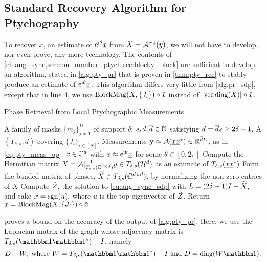 \subsection{Standard Recovery Algorithm for Ptychography}
\label{sec:pty_std_rec}
To recover $x$, an estimate of $\mathrm{e}^{\mathrm{i} \theta} \underline{x}$ from $X = \mathcal{A}^{-1}(y)$, we will not have to develop, nor even prove, any more technology.  The contents of \cref{ch:ang_sync,sec:con_number_ptych,sec:blocky_block} are sufficient to develop an algorithm, stated in \cref{alg:pty_pr} that is proven in \cref{thm:pty_rec} to stably produce an estimate of $\mathrm{e}^{\mathrm{i} \theta} \underline{x}$.  This algorithm differs very little from \cref{alg:pr_sdp}, except that in line 4, we use $\operatorname{BlockMag}(X, \{J_i\}) \circ \tilde{x}$ instead of $\lvert\operatorname{vec} \operatorname{diag}(X)\rvert \circ \tilde{x}$.

\begin{algorithm}
\renewcommand{\algorithmicrequire}{\textbf{Input:}}
\renewcommand{\algorithmicensure}{\textbf{Output:}}
\caption{Phase Retrieval from Local Ptychographic Measurements}
\label{alg:pty_pr}
\begin{algorithmic}[1]
    \REQUIRE A family of masks $\{m_j\}_{j = 1}^D$ of support $\delta$; $s, d, \overline{d} \in \mathbb{N}$ satisfying $d = \overline{d} s \ge 2 \delta - 1$.  A $(T_{\delta, s}, d)$-covering $\{J_i\}_{i \in [N]}$.  Measurements $\mathbf{y} \approx \mathcal{A}(\underline{x} \underline{x}^*) \in \mathbb{R}^{\overline{d} D}$, as in \eqref{eq:pty_meas_op}.
    \ENSURE $x \in \mathbb{C}^d$ with $x \approx \mathrm{e}^{\mathrm{i} \theta} \underline{x}$ for some $\theta \in [0, 2 \pi]$
    \STATE Compute the Hermitian matrix $X = \mathcal{A}|_{T_{\delta, s}(\mathbb{C}^{d \times d})}^{-1} y \in T_{\delta, s}(\mathcal{H}^d)$ as an estimate of $T_{\delta, s}(\underline{x} \underline{x}^*)$
    \STATE Form the banded matrix of phases, $\widetilde{X} \in T_{\delta, s}(\mathbb{C}^{d \times d})$, by normalizing the non-zero entries of $X$ %
    \STATE Compute $\hat{Z}$, the solution to \eqref{eq:ang_sync_sdp} with $L = (2 \delta - 1) I - \widetilde{X}$, and take $\tilde{x} = \operatorname{sgn}(u),$ where $u$ is the top eigenvector of $\hat{Z}$.
    \STATE Return $x = \operatorname{BlockMag}(X, \{J_i\}) \circ \tilde{x}$
\end{algorithmic}
\end{algorithm}

 proves a bound on the accuracy of the output of \cref{alg:pty_pr}.  Here, we use the Laplacian matrix of the graph whose adjacency matrix is $T_{\delta, s}(\one \one^*) - I$, namely \begin{equation}D - W, \ \text{where} \ W = T_{\delta, s}(\one \one^*) - I \ \text{and} \ D = \diag(W \one).\label{eq:pty_lap}\end{equation}


